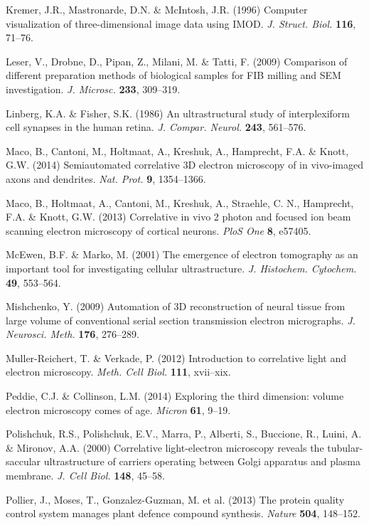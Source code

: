 \documentclass{article}
\begin{document}
\begin{hangpars}
Kremer, J.R., Mastronarde, D.N. \& McIntosh, J.R. (1996) Computer visualization of three-dimensional image data using IMOD. \textit{J. Struct. Biol.} \textbf{116}, 71–76.

Leser, V., Drobne, D., Pipan, Z., Milani, M. \& Tatti, F. (2009) Comparison of different preparation methods of biological samples for FIB milling and SEM investigation. \textit{J. Microsc.} \textbf{233}, 309–319.

Linberg, K.A. \& Fisher, S.K. (1986) An ultrastructural study of interplexiform cell synapses in the human retina. \textit{J. Compar. Neurol.} \textbf{243}, 561–576.

Maco, B., Cantoni, M., Holtmaat, A., Kreshuk, A., Hamprecht, F.A. \& Knott, G.W. (2014) Semiautomated correlative 3D electron microscopy of in vivo-imaged axons and dendrites. \textit{Nat. Prot.} \textbf{9}, 1354–1366.

Maco, B., Holtmaat, A., Cantoni, M., Kreshuk, A., Straehle, C. N., Hamprecht, F.A. \& Knott, G.W. (2013) Correlative in vivo 2 photon and focused ion beam scanning electron microscopy of cortical neurons. \textit{PloS One} \textbf{8}, e57405.

McEwen, B.F. \& Marko, M. (2001) The emergence of electron tomography as an important tool for investigating cellular ultrastructure. \textit{J. Histochem. Cytochem.} \textbf{49}, 553–564.

Mishchenko, Y. (2009) Automation of 3D reconstruction of neural tissue from large volume of conventional serial section transmission electron micrographs. \textit{J. Neurosci. Meth.} \textbf{176}, 276–289.

Muller-Reichert, T. \& Verkade, P. (2012) Introduction to correlative light and electron microscopy. \textit{Meth. Cell Biol.} \textbf{111}, xvii–xix.

Peddie, C.J. \& Collinson, L.M. (2014) Exploring the third dimension: volume electron microscopy comes of age. \textit{Micron} \textbf{61}, 9–19.

Polishchuk, R.S., Polishchuk, E.V., Marra, P., Alberti, S., Buccione, R., Luini, A. \& Mironov, A.A. (2000) Correlative light-electron microscopy reveals the tubular-saccular ultrastructure of carriers operating between Golgi apparatus and plasma membrane. \textit{J. Cell Biol.} \textbf{148}, 45–58.

Pollier, J., Moses, T., Gonzalez-Guzman, M. et al. (2013) The protein quality control system manages plant defence compound synthesis. \textit{Nature} \textbf{504}, 148–152.


\end{hangpars}
\end{document}
